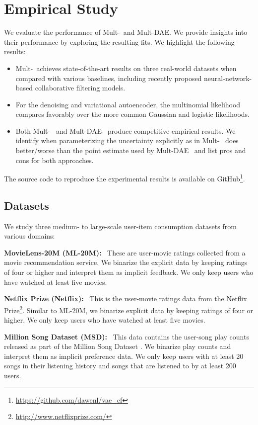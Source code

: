 \documentclass[sigconf]{acmart}
\DeclareRobustCommand{\parhead}[1]{\textbf{#1}~}
\newcommand{\mvae}{{\small Mult-}}
\newcommand{\mdae}{{\small Mult-}\gls{DAE}}
\begin{document}
\section{Empirical Study} \label{sec:exp}

We evaluate the performance of \mvae~and \mdae. We provide insights into their performance by exploring the resulting fits. We highlight the following results:  
\begin{itemize}
	\item \mvae~achieves state-of-the-art results on three real-world datasets when compared with various baselines, including recently proposed neural-network-based collaborative filtering models. 
	\item For the denoising and variational autoencoder, the multinomial likelihood compares favorably over the more common Gaussian and logistic likelihoods. 
	\item Both \mvae~ and \mdae~ produce competitive empirical results. We identify when parameterizing the uncertainty explicitly as in \mvae~ does better/worse than the point estimate used by \mdae~ and list pros and cons for both approaches.
\end{itemize}

The source code to reproduce the experimental results is available on GitHub\footnote{\url{https://github.com/dawenl/vae_cf}}. 

\subsection{Datasets} \label{sec:exp_data}

We study three medium- to large-scale user-item consumption
datasets from various domains: 

\parhead{MovieLens-20M (ML-20M):} These are user-movie ratings collected
from a movie recommendation service. We binarize the
explicit data by keeping ratings of four or higher and
interpret them as implicit feedback. We only keep users who
have watched at least five movies.

\parhead{Netflix Prize (Netflix):} This is the user-movie ratings data from the Netflix Prize\footnote{\url{http://www.netflixprize.com/}}. Similar to ML-20M, we binarize explicit data by keeping ratings of four or higher. We only keep users who have watched at least five movies. 

\parhead{Million Song Dataset (MSD):} This data contains the user-song play counts released as part of the Million Song Dataset \citep{bertin2011million}. We binarize play
counts and interpret them as implicit preference data. We only
keep users with at least 20 songs in their listening history
and songs that are listened to by at least 200 users.
\end{document}
